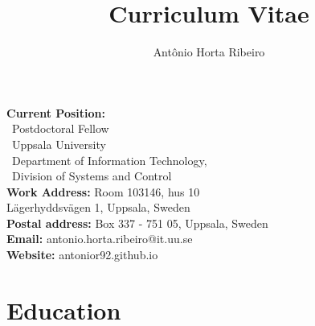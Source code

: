 \documentclass[10pt,letterpaper]{article} %
\title{Curriculum Vitae}
\author{Ant\^onio Horta Ribeiro}
\begin{document}
\maketitle

\begin{tcolorbox}[standard jigsaw, opacityback=0]
    \vspace{-4pt}
\begin{multicols}{2}
    \small
    \textbf{Current Position:}\\
    \, Postdoctoral Fellow\\
    \, Uppsala University \\
    \, Department of Information Technology,\\
    \, Division of Systems and Control\\
    {\bf Work Address:} Room 103146, hus 10 \\
    \phantom{\bf Work address:} Lägerhyddsvägen 1, Uppsala, Sweden\\
    {\bf Postal address:} Box 337 - 751 05, Uppsala, Sweden\\
    {\bf Email:} antonio.horta.ribeiro@it.uu.se\\
    {\bf Website:} antonior92.github.io
\end{multicols}
\end{tcolorbox}


\section*{Education} %
\end{document}
